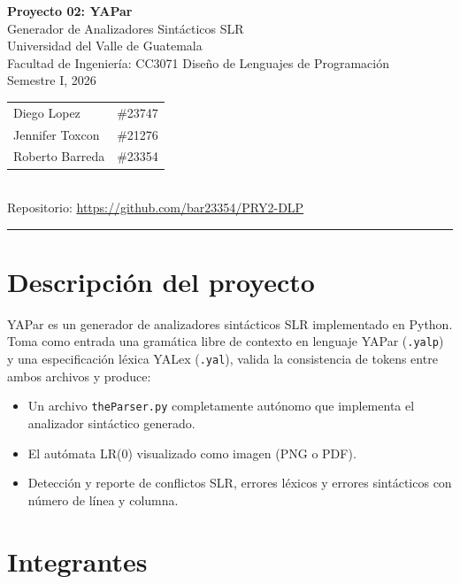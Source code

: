 \documentclass[11pt,a4paper]{article}
\begin{document}
\begin{center}
  {\Large\bfseries Proyecto 02: YAPar}\\[4pt]
  {\large Generador de Analizadores Sintácticos SLR}\\[8pt]
  \small Universidad del Valle de Guatemala\\
  Facultad de Ingeniería: CC3071 Diseño de Lenguajes de Programación\\
  Semestre I, 2026\\[8pt]
  \begin{tabular}{ll}
    Diego Lopez     & \#23747 \\
    Jennifer Toxcon & \#21276 \\
    Roberto Barreda & \#23354 \\
  \end{tabular}\\[6pt]
  \small Repositorio: \url{https://github.com/bar23354/PRY2-DLP}
\end{center}

\hrule
\vspace{10pt}

\section{Descripción del proyecto}

YAPar es un generador de analizadores sintácticos SLR implementado en Python.
Toma como entrada una gramática libre de contexto en lenguaje YAPar
(\texttt{.yalp}) y una especificación léxica YALex (\texttt{.yal}), valida la
consistencia de tokens entre ambos archivos y produce:

\begin{itemize}[noitemsep]
  \item Un archivo \texttt{theParser.py} completamente autónomo que implementa
        el analizador sintáctico generado.
  \item El autómata LR(0) visualizado como imagen (PNG o PDF).
  \item Detección y reporte de conflictos SLR, errores léxicos y errores
        sintácticos con número de línea y columna.
\end{itemize}

\section{Integrantes}
\end{document}

